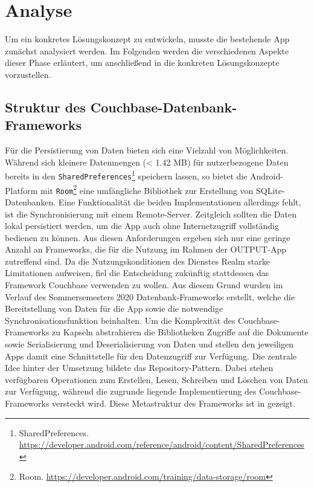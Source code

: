 \chapter{Analyse}\label{ch:analyse}

Um ein konkretes Lösungskonzept zu entwickeln, musste die bestehende App zunächst analysiert werden. Im Folgenden werden die verschiedenen Aspekte dieser Phase erläutert, um anschließend in  die konkreten Lösungskonzepte vorzustellen.

\section{Struktur des Couchbase-Datenbank-Frameworks}\label{se:framework}

Für die Persistierung von Daten bieten sich eine Vielzahl von Möglichkeiten. Während sich kleinere Datenmengen (< 1.42 MB) für nutzerbezogene Daten bereits in den \texttt{SharedPreferences}\footnote{SharedPreferences. \url{https://developer.android.com/reference/android/content/SharedPreferences}} speichern lassen, so bietet die Android-Platform mit \texttt{Room}\footnote{Room. \url{https://developer.android.com/training/data-storage/room}} eine umfängliche Bibliothek zur Erstellung von SQLite-Datenbanken. Eine Funktionalität die beiden Implementationen allerdings fehlt, ist die Synchronisierung mit einem Remote-Server. Zeitgleich sollten die Daten lokal persistiert werden, um die App auch ohne Internetzugriff vollständig bedienen zu können. Aus diesen Anforderungen ergeben sich nur eine geringe Anzahl an Frameworks, die für die Nutzung im Rahmen der OUTPUT-App zutreffend sind. Da die Nutzungskonditionen des Dienstes Realm starke Limitationen aufweisen, fiel die Entscheidung zukünftig stattdessen das Framework Couchbase verwenden zu wollen. Aus diesem Grund wurden im Verlauf des Sommersemesters 2020 Datenbank-Frameworks erstellt, welche die Bereitstellung von Daten für die App sowie die notwendige Synchronisationsfunktion beinhalten. Um die Komplexität des Couchbase-Frameworks zu Kapseln abstrahieren die Bibliotheken Zugriffe auf die Dokumente sowie Serialisierung und Deserialisierung von Daten und stellen den jeweiligen Apps damit eine Schnittstelle für den Datenzugriff zur Verfügung. Die zentrale Idee hinter der Umsetzung bildete das Repository-Pattern. Dabei stehen verfügbaren Operationen zum Erstellen, Lesen, Schreiben und Löschen von Daten zur Verfügung, während die zugrunde liegende Implementierung des Couchbase-Frameworks versteckt wird. Diese Metastruktur des Frameworks ist in  gezeigt.

